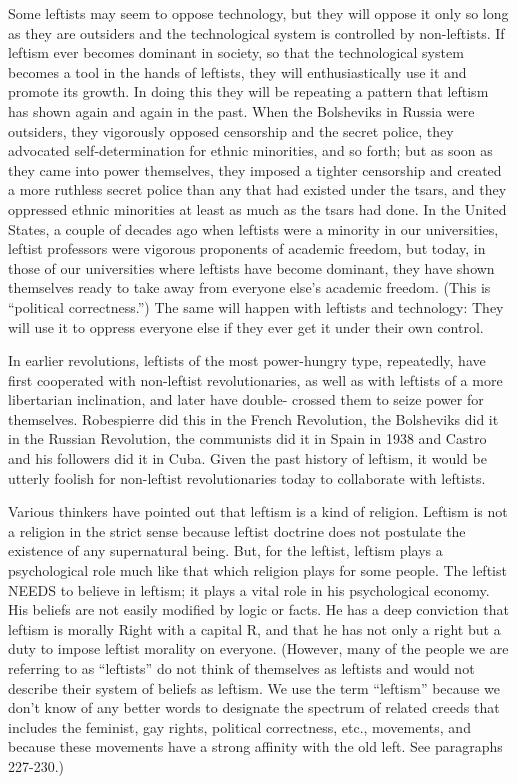  Some leftists may seem to oppose technology, but they will oppose it only so long as they are outsiders and the technological system is controlled by non-leftists. If leftism ever becomes dominant in society, so that the technological system becomes a tool in the hands of leftists, they will enthusiastically use it and promote its growth. In doing this they will be repeating a pattern that leftism has shown again and again in the past. When the Bolsheviks in Russia were outsiders, they vigorously opposed censorship and the secret police, they advocated self-determination for ethnic minorities, and so forth; but as soon as they came into power themselves, they imposed a tighter censorship and created a more ruthless secret police than any that had existed under the tsars, and they oppressed ethnic minorities at least as much as the tsars had done. In the United States, a couple of decades ago when leftists were a minority in our universities, leftist professors were vigorous proponents of academic freedom, but today, in those of our universities where leftists have become dominant, they have shown themselves ready to take away from everyone else’s academic freedom. (This is “political correctness.”) The same will happen with leftists and technology: They will use it to oppress everyone else if they ever get it under their own control.

 In earlier revolutions, leftists of the most power-hungry type, repeatedly, have first cooperated with non-leftist revolutionaries, as well as with leftists of a more libertarian inclination, and later have double- crossed them to seize power for themselves. Robespierre did this in the French Revolution, the Bolsheviks did it in the Russian Revolution, the communists did it in Spain in 1938 and Castro and his followers did it in Cuba. Given the past history of leftism, it would be utterly foolish for non-leftist revolutionaries today to collaborate with leftists.

 Various thinkers have pointed out that leftism is a kind of religion. Leftism is not a religion in the strict sense because leftist doctrine does not postulate the existence of any supernatural being. But, for the leftist, leftism plays a psychological role much like that which religion plays for some people. The leftist NEEDS to believe in leftism; it plays a vital role in his psychological economy. His beliefs are not easily modified by logic or facts. He has a deep conviction that leftism is morally Right with a capital R, and that he has not only a right but a duty to impose leftist morality on everyone. (However, many of the people we are referring to as “leftists” do not think of themselves as leftists and would not describe their system of beliefs as leftism. We use the term “leftism” because we don’t know of any better words to designate the spectrum of related creeds that includes the feminist, gay rights, political correctness, etc., movements, and because these movements have a strong affinity with the old left. See paragraphs 227-230.)

